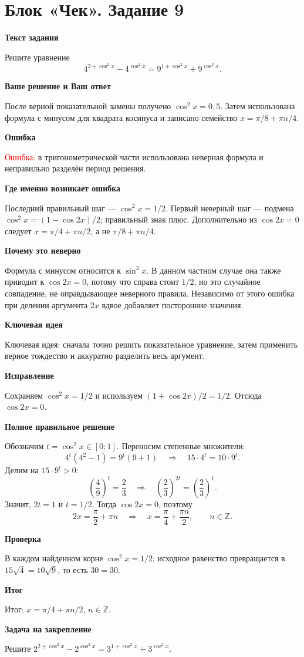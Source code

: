 \documentclass[11pt,a4paper]{article}
\newcommand{\Part}[1]{\par\medskip\noindent\textbf{#1}\par\smallskip}
\newcommand{\Task}[2]{\clearpage\phantomsection\label{task:#1}\section*{#2}}
\newcommand{\Err}[1]{\textcolor{red}{Ошибка:} #1}
\newcommand{\Idea}[1]{\textcolor{blue!60!black}{Ключевая идея:} #1}
\newcommand{\Result}[1]{\textcolor{teal!60!black}{Итог:} #1}
\begin{document}
\Task{c9}{Блок «Чек». Задание 9}
\Part{Текст задания}
Решите уравнение
\[4^{2+\cos^2x}-4^{\cos^2x}=9^{1+\cos^2x}+9^{\cos^2x}.\]
\Part{Ваше решение и Ваш ответ}
После верной показательной замены получено $\cos^2x=0{,}5$. Затем использована формула с минусом для квадрата косинуса и записано семейство $x=\pi/8+\pi n/4$.
\Part{Ошибка}
\Err{в тригонометрической части использована неверная формула и неправильно разделён период решения.}
\Part{Где именно возникает ошибка}
Последний правильный шаг --- $\cos^2x=1/2$. Первый неверный шаг --- подмена $\cos^2x=(1-\cos2x)/2$; правильный знак плюс. Дополнительно из $\cos2x=0$ следует $x=\pi/4+\pi n/2$, а не $\pi/8+\pi n/4$.
\Part{Почему это неверно}
Формула с минусом относится к $\sin^2x$. В данном частном случае она также приводит к $\cos2x=0$, потому что справа стоит $1/2$, но это случайное совпадение, не оправдывающее неверного правила. Независимо от этого ошибка при делении аргумента $2x$ вдвое добавляет посторонние значения.
\Part{Ключевая идея}
\Idea{сначала точно решить показательное уравнение, затем применить верное тождество и аккуратно разделить весь аргумент.}
\Part{Исправление}
Сохраняем $\cos^2x=1/2$ и используем $(1+\cos2x)/2=1/2$. Отсюда $\cos2x=0$.
\Part{Полное правильное решение}
Обозначим $t=\cos^2x\in[0;1]$. Переносим степенные множители:
\[4^t(4^2-1)=9^t(9+1)\quad\Longrightarrow\quad15\cdot4^t=10\cdot9^t.\]
Делим на $15\cdot9^t>0$:
\[\left(\frac49\right)^t=\frac23\quad\Longrightarrow\quad\left(\frac23\right)^{2t}=\left(\frac23\right)^1.\]
Значит, $2t=1$ и $t=1/2$. Тогда $\cos2x=0$, поэтому
\[2x=\frac\pi2+\pi n\quad\Longrightarrow\quad x=\frac\pi4+\frac{\pi n}{2},\qquad n\in\mathbb Z.\]
\Part{Проверка}
В каждом найденном корне $\cos^2x=1/2$; исходное равенство превращается в $15\sqrt4=10\sqrt9$, то есть $30=30$.
\Part{Итог}
\Result{$x=\pi/4+\pi n/2$, $n\in\mathbb Z$.}
\Part{Задача на закрепление}
Решите $2^{2+\cos^2x}-2^{\cos^2x}=3^{1+\cos^2x}+3^{\cos^2x}$.
\end{document}
